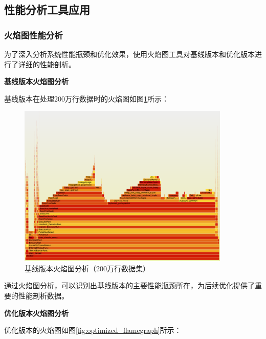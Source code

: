 \subsection{性能分析工具应用}

\subsubsection{火焰图性能分析}

为了深入分析系统性能瓶颈和优化效果，使用火焰图工具对基线版本和优化版本进行了详细的性能剖析。

\textbf{基线版本火焰图分析}

基线版本在处理200万行数据时的火焰图如图\ref{fig:baseline_flamegraph}所示：

\begin{figure}[htbp]
\centering
\includegraphics[width=0.9\textwidth]{assets/testdata_baseline/baseline火焰图.jpg}
\caption{基线版本火焰图分析（200万行数据集）}
\label{fig:baseline_flamegraph}
\end{figure}

通过火焰图分析，可以识别出基线版本的主要性能瓶颈所在，为后续优化提供了重要的性能剖析数据。

\textbf{优化版本火焰图分析}

优化版本的火焰图如图\ref{fig:optimized_flamegraph}所示：

